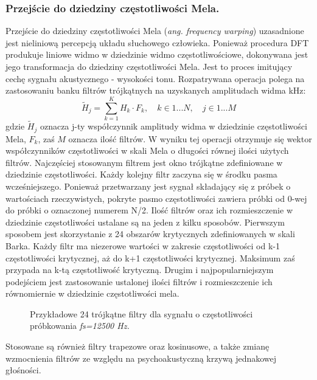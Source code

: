 \subsubsection{Przejście do dziedziny częstotliwości Mela.}
Przejście do dziedziny częstotliwości Mela (\textit{ang. frequency warping}) uzasadnione jest nieliniową percepcją układu słuchowego człowieka. Ponieważ procedura DFT produkuje liniowe widmo w dziedzinie widmo częstotliwościowe, dokonywana jest jego transformacja do dziedziny częstotliwości Mela. Jest to proces imitujący cechę sygnału akustycznego - wysokości tonu.
Rozpatrywana operacja polega na zastosowaniu banku filtrów trójkątnych na uzyskanych amplitudach widma kHz:
\begin{equation}
  \tilde{H}_j = \sum_{k=1}^{K} H_k \cdot F_k, \quad k \in {1...N}, \quad  j \in {1...M}
\end{equation}
gdzie $\tilde{H}_j$ oznacza j-ty współczynnik amplitudy widma w dziedzinie częstotliwości Mela, $F_k$, zaś $M$ oznacza ilość filtrów.
W wyniku tej operacji otrzymuje się wektor współczynników częstotliwości w skali Mela o długości równej ilości użytych filtrów. Najczęściej stosowanym filtrem jest okno trójkątne zdefiniowane w dziedzinie częstotliwości. Każdy kolejny filtr zaczyna się w środku pasma wcześniejszego. Ponieważ przetwarzany jest sygnał składający się z próbek o wartościach rzeczywistych, pokryte pasmo częstotliwości zawiera próbki od 0-wej do próbki o oznaczonej numerem N/2. Ilość filtrów oraz ich rozmieszczenie w dziedzinie częstotliwości ustalane są na jeden z kilku sposobów.
Pierwszym sposobem jest skorzystanie z 24 obszarów krytycznych zdefiniowanych w skali Barka. Każdy filtr ma niezerowe wartości w zakresie częstotliwości od k-1 częstotliwości krytycznej, aż do k+1 częstotliwości krytycznej. Maksimum zaś przypada na k-tą częstotliwość krytyczną.
Drugim i najpopularniejszym podejściem jest zastosowanie ustalonej ilości filtrów i rozmieszczenie ich równomiernie w dziedzinie częstotliwości mela.

\begin{figure}
  \centering
    
    \label{melfb}
    \caption{Przykładowe 24 trójkątne filtry dla sygnału o częstotliwości próbkowania \textit{fs=12500 Hz.}}
\end{figure}

Stosowane są również filtry trapezowe oraz kosinusowe, a także zmianę wzmocnienia filtrów ze względu na psychoakustyczną krzywą jednakowej głośności. 

